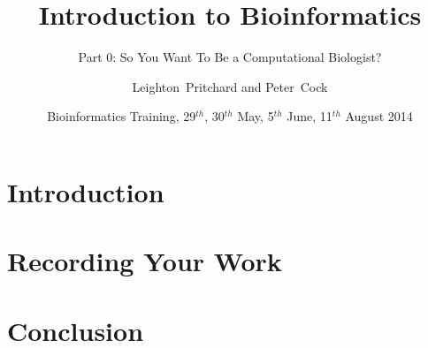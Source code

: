 
%



\title[Intro to Bioinformatics] %
{Introduction to Bioinformatics}
\subtitle{Part 0: So You Want To Be a Computational Biologist?}
\author[Pritchard, Cock] %
{Leighton~Pritchard and Peter~Cock}
\date[May, June, August 2014] %
{Bioinformatics Training, 29$^{th}$, 30$^{th}$ May,  5$^{th}$ June, 11$^{th}$ August 2014}
\subject{Bioinformatics}





\frame[plain]{\titlepage}


    
\section{Introduction}
  

\section{Recording Your Work}
     
   
  

\section{Conclusion}
  


